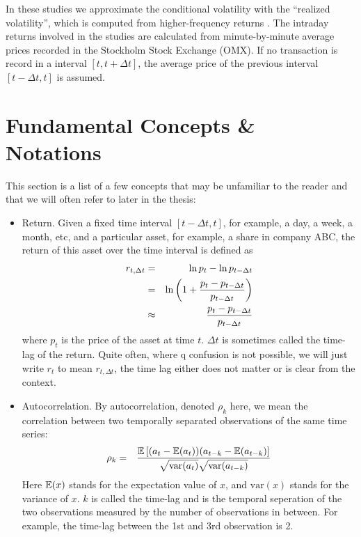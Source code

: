 \documentclass{report}
\begin{document}
In these studies we approximate the conditional volatility with the
``realized volatility'', which is computed from higher-frequency
returns \cite{Mikosch2009}.
The intraday returns involved in the studies are calculated from
minute-by-minute average prices recorded in the Stockholm Stock
Exchange (OMX). If no transaction is record in a interval $[t, t +
\Delta t]$, the average price of the previous interval $[t - \Delta t,
t]$ is assumed.

\section{Fundamental Concepts \& Notations}
\label{sec:FundamentalConcepts}
This section is a list of a few concepts that may be unfamiliar to the
reader and that we will often refer to later in the thesis:
\begin{itemize}
\item Return. Given a fixed time interval $[t - \Delta t, t]$, for example, a
  day, a week, a month, etc, and a particular asset, for example, a
  share in company ABC, the return of this asset over the time
  interval is defined as
  \begin{eqnarray*}
    r_{t, \Delta t} &=& \ln p_{t} - \ln p_{t - \Delta t} \\
    &=& \ln \left(1 + {p_{t} - p_{t - \Delta t} \over p_{t - \Delta t}}\right) \\
    &\approx& {p_{t} - p_{t - \Delta t} \over p_{t - \Delta t}}
  \end{eqnarray*}
  where $p_t$ is the price of the asset at time $t$. $\Delta t$ is
  sometimes called the time-lag of the return. Quite often, where
q  confusion is not possible, we will just write $r_t$ to mean $r_{t,
    \Delta t}$, the time lag either does not matter or is clear from
  the context.

\item Autocorrelation. By autocorrelation, denoted $\rho_k$ here, we
  mean the correlation between two temporally separated observations
  of the same time series:
  \begin{eqnarray*}
    \rho_k &=& {
      \mathbb{E}\left[(a_t -\mathbb{E}(a_t))(a_{t-k} - \mathbb{E}(a_{t-k})\right]
      \over
      \sqrt{\text{var}(a_t)}\sqrt{\text{var}(a_{t-k})}
    }
  \end{eqnarray*}
  Here $\mathbb{E}(x)$ stands for the expectation value of $x$, and
  $\text{var}(x)$ stands for the variance of $x$. $k$ is called the
  time-lag and is the temporal seperation of the two observations
  measured by the number of observations in between. For example, the
  time-lag between the 1st and 3rd observation is 2.


\end{itemize}
\end{document}
